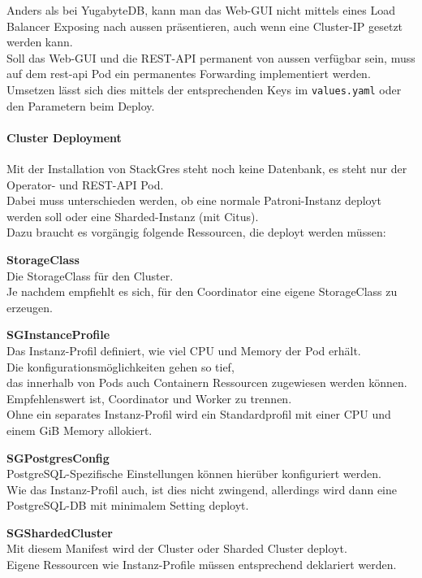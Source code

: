 \begin{flushleft}
    Anders als bei YugabyteDB, kann man das Web-GUI nicht mittels eines Load Balancer Exposing nach aussen präsentieren, auch wenn eine Cluster-IP gesetzt werden kann.\\
    Soll das Web-GUI und die REST-API permanent von aussen verfügbar sein, muss auf dem rest-api Pod ein permanentes Forwarding implementiert werden.\\
    Umsetzen lässt sich dies mittels der entsprechenden Keys im \texttt{values.yaml} oder den Parametern beim Deploy.
\end{flushleft}
\begin{flushleft}
    \paragraph{Cluster Deployment}
    Mit der Installation von StackGres steht noch keine Datenbank, es steht nur der Operator- und REST-API Pod.\\
    Dabei muss unterschieden werden, ob eine normale Patroni-Instanz deployt werden soll oder eine Sharded-Instanz (mit Citus).\\
    Dazu braucht es vorgängig folgende Ressourcen, die deployt werden müssen:\\
    \begin{description}
        \item \textbf{StorageClass}\hfill \\Die StorageClass für den Cluster.\\Je nachdem empfiehlt es sich, für den Coordinator eine eigene StorageClass zu erzeugen.
        \item \textbf{SGInstanceProfile}\hfill \\Das Instanz-Profil definiert, wie viel CPU und Memory der Pod erhält.\\Die konfigurationsmöglichkeiten gehen so tief,\\das innerhalb von Pods auch Containern Ressourcen zugewiesen werden können.\\ Empfehlenswert ist, Coordinator und Worker zu trennen.\\Ohne ein separates Instanz-Profil wird ein Standardprofil mit einer CPU und einem GiB Memory allokiert.
        \item \textbf{SGPostgresConfig}\hfill \\PostgreSQL-Spezifische Einstellungen können hierüber konfiguriert werden.\\Wie das Instanz-Profil auch, ist dies nicht zwingend, allerdings wird dann eine PostgreSQL-DB mit minimalem Setting deployt.
        \item \textbf{SGShardedCluster}\hfill \\Mit diesem Manifest wird der Cluster oder Sharded Cluster deployt.\\Eigene Ressourcen wie Instanz-Profile müssen entsprechend deklariert werden.
    \end{description}
\end{flushleft}
